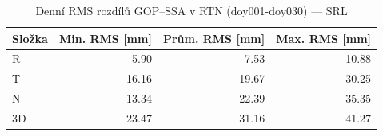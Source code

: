 \begin{table}[H]
\centering
\caption{Denní RMS rozdílů GOP–SSA v RTN (doy001-doy030) — SRL}
\label{tab:sa_ZAZG_doy001-doy030_rms}
\begin{tabular}{lrrr}
\toprule
Složka & Min. RMS [mm] & Prům. RMS [mm] & Max. RMS [mm] \\
\midrule
R & 5.90 & 7.53 & 10.88 \\
T & 16.16 & 19.67 & 30.25 \\
N & 13.34 & 22.39 & 35.35 \\
3D & 23.47 & 31.16 & 41.27 \\
\bottomrule
\end{tabular}
\end{table}
